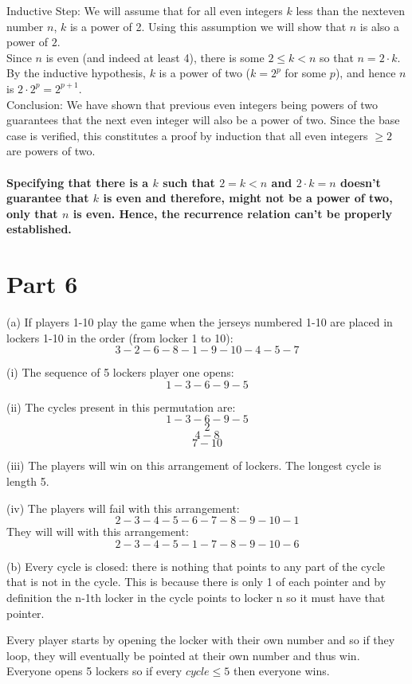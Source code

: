\documentclass{article}
\begin{document}
Inductive Step: We will assume that for all even integers $k$ less than the nexteven number $n$, $k$ is a power of 2.  Using this assumption we will show that $n$ is also a power of $2$.\\

Since $n$ is even (and indeed at least 4), there is some $2\le k<n$ so that $n=2\cdot k$.  By the inductive hypothesis, $k$ is a power of two ($k=2^p$ for some $p$), and hence $n$ is $2\cdot 2^p=2^{p+1}$.  \\

Conclusion: We have shown that previous even integers being powers of two guarantees that the next even integer will also be a power of two.  Since the base case is verified, this constitutes a proof by induction that all even integers $\ge 2$ are powers of two.\\

\paragraph{Specifying that there is a $k$ such that $2=k<n$ and $2·k=n$ doesn’t guarantee that $k$ is even and therefore, might not be a power of two, only that $n$ is even. Hence, the recurrence relation can’t be properly established.}
\newpage
\section{Part 6}
(a)  If players 1-10 play the game when the jerseys numbered 1-10 are placed in lockers 1-10 in the order (from locker 1 to 10):
$$3-2-6-8-1-9-10-4-5-7$$

(i) The sequence of 5 lockers player one opens:
$$1-3-6-9-5$$

(ii) The cycles present in this permutation are:
$$1-3-6-9-5$$
$$2$$
$$4-8$$
$$7-10$$

(iii) The players will win on this arrangement of lockers. The longest cycle is length 5.

(iv) The players will fail with this arrangement:
$$2-3-4-5-6-7-8-9-10-1$$
They will will with this arrangement:
$$2-3-4-5-1-7-8-9-10-6$$


(b) Every cycle is closed: there is nothing that points to any part of the cycle that is not in the cycle. This is because there is only 1 of each pointer and by  definition the n-1th locker in the cycle points to locker n so it must have that pointer.

Every player starts by opening the locker with their own number and so if they loop, they will eventually be pointed at their own number and thus win. Everyone opens 5 lockers so if every $cycle \leq 5$ then everyone wins.
\end{document}
